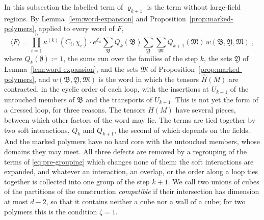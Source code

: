 \documentclass[11pt]{preprint}
\numberwithin{equation}{section}
\theoremstyle{definition}
\theoremstyle{remark}
\theoremstyle{plain}
\begin{document}
In this subsection the labelled term of $\varrho_{k+1}$ is the term without large-field regions. By Lemma~\ref{lem:word-expansion} and Proposition~\ref{prop:marked-polymers}, applied to every word of $F$,
\begin{equation}\label{eq:pre-grouping}
    \langle F\rangle = \prod_{i=1}^{n}\kappa^{(k)}(C_i, \chi_i)\cdot e^{\mathcal E_k}\sum_{\mathfrak B}Q_k(\mathfrak B)\sum_{\mathfrak Y}\sum_{\mathfrak M}Q_{k+1}(\mathfrak M)\,w(\mathfrak B, \mathfrak Y, \mathfrak M)\;,
\end{equation}
where $Q_k(\emptyset) \coloneqq 1$, the sums run over the families of the step $k$, the sets $\mathfrak Y$ of Lemma~\ref{lem:word-expansion}, and the sets $\mathfrak M$ of Proposition~\ref{prop:marked-polymers}, and $w(\mathfrak B, \mathfrak Y, \mathfrak M)$ is the word in which the tensors $\hat H(M)$ are contracted, in the cyclic order of each loop, with the insertions at $U_{k+1}$ of the untouched members of $\mathfrak B$ and the transports of $U_{k+1}$. This is not yet the form of a dressed loop, for three reasons. The tensors $\hat H(M)$ have several pieces, between which other factors of the word may lie. The terms are tied together by two soft interactions, $Q_k$ and $Q_{k+1}$, the second of which depends on the fields. And the marked polymers have no hard core with the untouched members, whose domains they may meet. All three defects are removed by a regrouping of the terms of \eqref{eq:pre-grouping} which changes none of them: the soft interactions are expanded, and whatever an interaction, an overlap, or the order along a loop ties together is collected into one group of the step $k + 1$. We call two unions of cubes of the partitions of the construction \emph{compatible} if their intersection has dimension at most $d - 2$, so that it contains neither a cube nor a wall of a cube; for two polymers this is the condition $\zeta = 1$.
\end{document}
